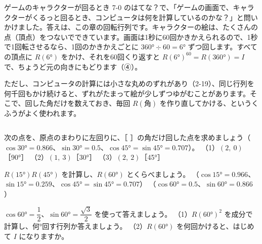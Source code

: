 \begin{column}{ゲームのキャラクターが回るとき}
7-0 のはてな？で、「ゲームの画面で、キャラクターがくるっと回るとき、コンピュータは何を計算しているのかな？」と問いかけました。答えは、この章の回転行列です。キャラクターの絵は、たくさんの点（頂点）をつないでできています。画面は1秒に60回かきかえられるので、1秒で1回転させるなら、1回のかきかえごとに $360°\div60=6°$ ずつ回します。すべての頂点に $R(6°)$ をかけ、それを60回くり返すと $R(6°)^{60}=R(360°)=I$ で、ちょうど元の向きにもどります（④）。
\par\vspace{3pt}
ただし、コンピュータの計算には小さな丸めのずれがあり（2-19）、同じ行列を何千回もかけ続けると、ずれがたまって絵が少しずつゆがむことがあります。そこで、回した角だけを数えておき、毎回 $R(\text{角})$ を作り直してかける、というくふうがよく使われます。
\end{column}

\bkendproblems
{}

\bkproblem 次の点を、原点のまわりに左回りに、［ ］の角だけ回した点を求めましょう（$\cos30°=0.866$、$\sin30°=0.5$、$\cos45°=\sin45°=0.707$）。\newline
（1）\nobreak $(2,\ 0)$［90°］\newline
（2）\nobreak $(1,\ 3)$［30°］\newline
（3）\nobreak $(2,\ 2)$［45°］

\bkproblem $R(15°)R(45°)$ を計算し、$R(60°)$ とくらべましょう。\newline
（$\cos15°=0.966$、$\sin15°=0.259$、$\cos45°=\sin45°=0.707$）\newline
（$\cos60°=0.5$、$\sin60°=0.866$）

\bkproblem $\cos60°=\dfrac12$、$\sin60°=\dfrac{\sqrt3}{2}$ を使って答えましょう。\newline
（1）\nobreak $R(60°)^2$ を成分で計算し、何°回す行列か答えましょう。\newline
（2）\nobreak $R(60°)$ を何回かけると、はじめて $I$ になりますか。

